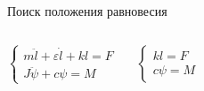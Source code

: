 \documentclass[ignoreonframetext,unicode]{beamer}
\begin{document}
\begin{frame}{Поиск положения равновесия}
	
		\begin{columns}
			\begin{block}{}
			\begin{equation*}
				\begin{cases*}
					m \ddot{l} + \varepsilon \dot{l} + k l  = F \\
					J \ddot{\psi} + c \psi = M
				\end{cases*}
				\label{lagrsdfdsfsange_fin}
			\end{equation*}
			\end{block}

			\begin{block}{}
			\begin{equation*}
				\begin{cases*}
					k l = F \\
					c \psi = M
				\end{cases*}
				\label{temp_ldsfsdfsdfagr}
			\end{equation*}
			\end{block}
		
\end{columns}



\vspace*{-1mm}
\begin{figure}[!htbp]
	\caption{}
	\label{res_chasdasdaeck_func_2}
\end{figure}



\end{frame}
\end{document}
